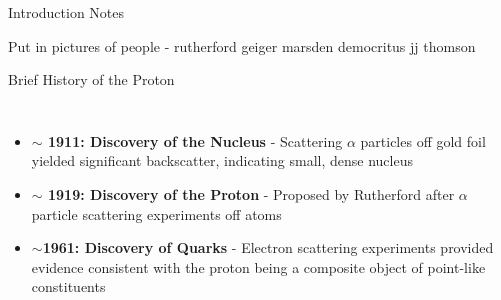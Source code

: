 \documentclass[aspectratio=169]{beamer}
\newcommand*{\myfont}{\fontfamily{lmtt}\selectfont}
\begin{document}
\begin{frame}{Introduction Notes}

Put in pictures of people - rutherford geiger marsden democritus jj thomson

\end{frame}
\begin{frame}{Brief History of the Proton}


   \begin{columns}
        
              \begin{itemize}
                    \setlength\itemsep{1em}
                    \item  \textbf{$\sim$ 1911: Discovery of the Nucleus} - Scattering $\alpha$ particles off gold foil yielded significant backscatter, indicating small, dense nucleus  {\myfont{\tiny  [Wikipedia:Geiger-Marsden]   }}
                    \item \textbf{$\sim$ 1919: Discovery of the Proton} - Proposed by Rutherford after $\alpha$ particle scattering experiments off atoms {\myfont{\tiny  [E. Rutherford doi:10.1080/14786431003659230]   }}
                    \item \textbf{$\sim$1961: Discovery of Quarks} - Electron scattering experiments provided evidence consistent with the proton being a composite object of point-like constituents 
                    \end{itemize}


\end{columns}
\end{frame}
\end{document}
